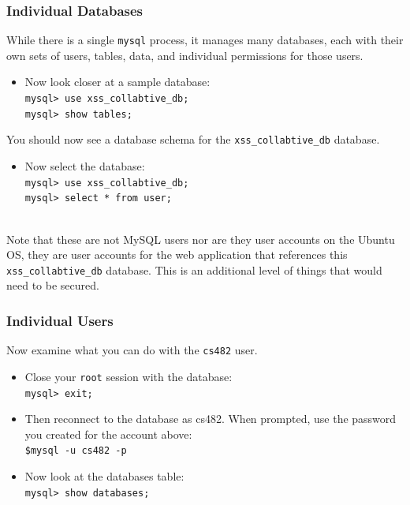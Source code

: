 \documentclass{article}
\begin{document}

\subsubsection{Individual Databases} While there is a single {\tt mysql} process, it manages many databases, each with their own sets of users, tables, data, and individual permissions for those users.  

\begin{itemize}
\item Now look closer at a sample database:  \\
{\tt mysql> use xss\_collabtive\_db; } \\
{\tt mysql> show tables; }

\end{itemize}
You should now see a database schema for the {\tt xss\_collabtive\_db} database.


\begin{itemize}
\item Now select the database: \\
{\tt mysql> use xss\_collabtive\_db; }\\
{\tt mysql> select * from user; }
\end{itemize}

 \\

\noindent	 
Note that these are not MySQL users nor are they user accounts on the Ubuntu OS, they are user accounts for the web application that references this {\tt xss\_collabtive\_db} database.  This is an additional level of things that would need to be secured.

\subsubsection{Individual Users}

Now examine what you can do with the {\tt cs482} user.

\begin{itemize}
\item Close your {\tt root} session with the database: \\
{\tt mysql> exit; }
\item Then reconnect to the database as cs482.  When prompted, use the password you created for the account above: \\
{\tt \$mysql -u cs482 -p }
\item Now look at the databases table: \\
{\tt mysql> show databases;   }
\end{itemize}
\end{document}

